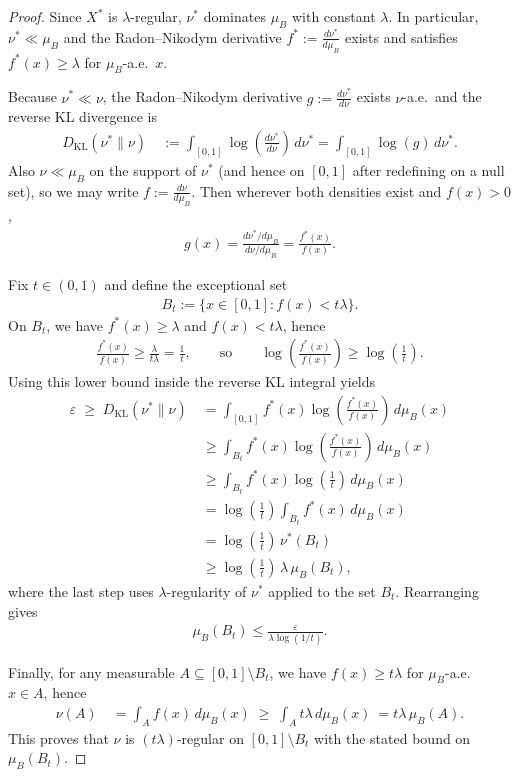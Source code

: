 \documentclass[10pt,a4paper]{amsart}
\begin{document}
\begin{proof}
Since $X^*$ is $\lambda$-regular, $\nu^*$ dominates $\mu_B$ with constant $\lambda$. In particular, $\nu^*\ll \mu_B$ and the Radon--Nikodym derivative $f^* := \frac{d\nu^*}{d\mu_B}$ exists and satisfies $f^*(x)\ge \lambda$ for $\mu_B$-a.e.\ $x$.

Because $\nu^*\ll \nu$, the Radon--Nikodym derivative $g := \frac{d\nu^*}{d\nu}$ exists $\nu$-a.e.\ and the reverse KL divergence is
\begin{align*}
D_{\mathrm{KL}}(\nu^*\|\nu)
&~:= \int_{[0,1]} \log\!\left(\frac{d\nu^*}{d\nu}\right)\, d\nu^*
 = \int_{[0,1]} \log(g)\, d\nu^*.
\end{align*}
Also $\nu\ll \mu_B$ on the support of $\nu^*$ (and hence on $[0,1]$ after redefining on a null set), so we may write $f:=\frac{d\nu}{d\mu_B}$. Then wherever both densities exist and $f(x)>0$,
\begin{align*}
g(x)=\frac{d\nu^*/d\mu_B}{d\nu/d\mu_B}=\frac{f^*(x)}{f(x)}.
\end{align*}

Fix $t\in(0,1)$ and define the exceptional set
\begin{align*}
B_t := \{x\in[0,1]: f(x) < t\lambda\}.
\end{align*}
On $B_t$, we have $f^*(x)\ge \lambda$ and $f(x)<t\lambda$, hence
\begin{align*}
\frac{f^*(x)}{f(x)} \ge \frac{\lambda}{t\lambda}=\frac1t,
\qquad\text{so}\qquad
\log\!\left(\frac{f^*(x)}{f(x)}\right) \ge \log\!\left(\frac1t\right).
\end{align*}
Using this lower bound inside the reverse KL integral yields
\begin{align*}
\varepsilon
\;\ge\; D_{\mathrm{KL}}(\nu^*\|\nu)
&~= \int_{[0,1]} f^*(x)\log\!\left(\frac{f^*(x)}{f(x)}\right)\, d\mu_B(x)\\
&~\ge \int_{B_t} f^*(x)\log\!\left(\frac{f^*(x)}{f(x)}\right)\, d\mu_B(x)\\
&~\ge \int_{B_t} f^*(x)\log\!\left(\frac1t\right)\, d\mu_B(x)\\
&~= \log\!\left(\frac1t\right)\int_{B_t} f^*(x)\, d\mu_B(x)\\
&~= \log\!\left(\frac1t\right)\,\nu^*(B_t)\\
&~\ge \log\!\left(\frac1t\right)\,\lambda\,\mu_B(B_t),
\end{align*}
where the last step uses $\lambda$-regularity of $\nu^*$ applied to the set $B_t$. Rearranging gives
\begin{align*}
\mu_B(B_t)\le \frac{\varepsilon}{\lambda\log(1/t)}.
\end{align*}

Finally, for any measurable $A\subseteq [0,1]\setminus B_t$, we have $f(x)\ge t\lambda$ for $\mu_B$-a.e.\ $x\in A$, hence
\begin{align*}
\nu(A)
&~= \int_A f(x)\, d\mu_B(x)
\;\ge\; \int_A t\lambda\, d\mu_B(x)
~= t\lambda\,\mu_B(A).
\end{align*}
This proves that $\nu$ is $(t\lambda)$-regular on $[0,1]\setminus B_t$ with the stated bound on $\mu_B(B_t)$.
\end{proof}
\end{document}
